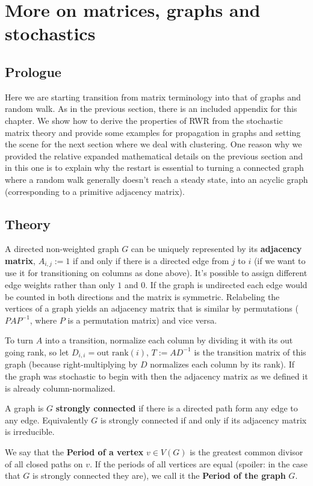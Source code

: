 \section{More on matrices, graphs and stochastics}
\subsection*{Prologue}

Here we are starting transition from matrix terminology into that
of graphs and random walk. 
As in the previous section, there is an included appendix for this
chapter.
We show how to derive the properties of
RWR from the stochastic matrix theory and provide some examples for
propagation in graphs and setting the scene for the next section
where we deal with clustering. One reason why we provided the
relative expanded mathematical details on the previous section and
in this one is to explain why the restart is essential to turning a 
connected graph where a random walk generally doesn't reach a
steady state, into an acyclic graph (corresponding to a primitive
adjacency matrix). 


\subsection*{Theory}

A directed non-weighted graph $G$ can be uniquely represented by its
\textbf{adjacency matrix},
$A_{i,j} := 1$ if and only if there is a directed edge from $j$ to $i$ (if we
want to use it for transitioning on columns as done above). It's possible to
assign different edge weights rather than only $1$ and $0$. If the graph is
undirected each edge would be counted in both directions and the matrix is
symmetric.
Relabeling the vertices of a graph yields an adjacency matrix that is similar by
permutations ($PAP^{-1}$, where $P$ is a permutation matrix) and vice versa.

To turn $A$ into a transition, normalize each column by dividing it with
its out going rank, so let $D_{i,i} = \text{out~rank}(i)$, $T:=AD^{-1}$ is the
transition matrix of this graph (because right-multiplying by $D$ normalizes each
column by its rank).
If the graph was stochastic to begin with then the adjacency matrix as we
defined it is already column-normalized.

\begin{mydef}
\label{def:stronglyconnected}
A graph is $G$ \textbf{strongly connected} if there is a directed path form any edge
to any edge. Equivalently $G$ is strongly connected if and only if its adjacency matrix is irreducible.

We say that the \textbf{Period of a vertex} $v \in V(G)$ is the greatest common
divisor of all closed paths on $v$. If the periods of all vertices are equal
(spoiler: in the case that $G$ is strongly connected they are), we call it the
\textbf{Period of the graph} $G$.
\end{mydef}

